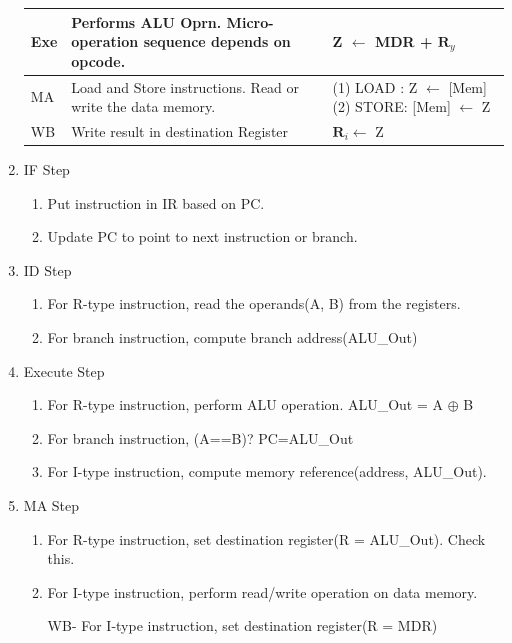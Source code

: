 \begin{enumerate}
\begin{myTableStyle}
\begin{tabular}{ |l|m{6cm}|m{8cm}| }
        Exe & Performs ALU Oprn. Micro-operation sequence depends on opcode.
            & Z \(\leftarrow\) MDR + {\large \( \boldsymbol R_y\)}  \\ \hline

        MA & Load and Store instructions. Read or write the data memory. & \makecell[l]{ (1) LOAD : Z \(\leftarrow\) [Mem]
                                           \\ (2) STORE: [Mem] \(\leftarrow\) Z } \\ \hline

        WB & Write result in destination Register &  {\large \( \boldsymbol R_i\)}\(\leftarrow\) Z \\ \hline
    \end{tabular} \end{myTableStyle} \vspace{0.08in}

    \newpage

    \item IF Step
    \begin{enumerate}
        \item Put instruction in IR based on PC.
        \item Update PC to point to next instruction or branch.
    \end{enumerate}

    \item ID Step
    \begin{enumerate}
        \item For R-type instruction, read the operands(A, B) from the registers.
        \item For branch instruction, compute branch address(ALU\_Out)
    \end{enumerate}

    \item Execute Step
    \begin{enumerate}
        \item For R-type instruction, perform ALU operation. ALU\_Out = A {\large \(\oplus\)} B
        \item For branch instruction, (A==B)? \; PC=ALU\_Out
        \item For I-type instruction, compute memory reference(address, ALU\_Out).
    \end{enumerate}

    \item MA Step
    \begin{enumerate}
        \item For R-type instruction, set destination register(R = ALU\_Out). Check this.
        \item For I-type instruction, perform read/write operation on data memory.
        \item[WB-] For I-type instruction, set destination register(R = MDR)
    \end{enumerate}


\end{enumerate}
